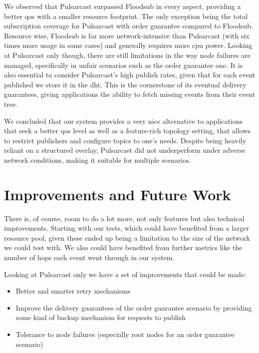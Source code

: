 We observed that Pulsarcast surpassed Floodsub in every aspect, providing a
better \acrshort{qos} with a smaller resource footprint. The only exception
being the total subscription coverage for Pulsarcast with order guarantee
compared to Floodsub.  Resource wise, Floodsub is far more network-intensive
than Pulsarcast (with six times more usage in some cases) and generally
requires more \acrshort{cpu} power. Looking at Pulsarcast only though, there
are still limitations in the way node failures are managed, specifically in
unfair scenarios such as the order guarantee one. It is also essential to
consider Pulsarcast's high publish rates, given that for each event published
we store it in the \acrshort{dht}. This is the cornerstone of its eventual
delivery guarantees, giving applications the ability to fetch missing events
from their event tree.

We concluded that our system provides a very nice alternative to applications
that seek a better \acrshort{qos} level as well as a feature-rich topology
setting, that allows to restrict publishers and configure topics to one's
needs. Despite being heavily reliant on a structured overlay, Pulsarcast did
not underperform under adverse network conditions, making it suitable for
multiple scenarios. 

\section{Improvements and Future Work}\label{improvements-future-work}

There is, of course, room to do a lot more, not only features but also
technical improvements. Starting with our tests, which could have benefited
from a larger resource pool, given these ended up being a limitation to the
size of the network we could test with. We also could have benefited from
further metrics like the number of hops each event went through in our system.

Looking at Pulsarcast only we have a set of improvements that could be made:

\begin{itemize}
  \item Better and smarter retry mechanisms
  \item Improve the delivery guarantees of the order guarantee scenario by providing some kind of backup mechanism for requests to publish
  \item Tolerance to node failures (especially root nodes for an order guarantee
  scenario)
\end{itemize}

